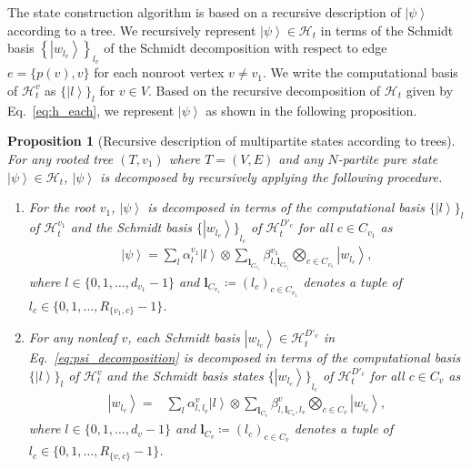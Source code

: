 \documentclass[preprintnumbers,aps,amsmath,amssymb,pra,twocolumn,showpacs,superscriptaddress,floatfix]{revtex4-1}
\def\Ket#1{\left|#1\right\rangle}
\theoremstyle{plain}
\newtheorem{proposition}[theorem]{Proposition}
\theoremstyle{definition}
\theoremstyle{remark}
\begin{document}
The state construction algorithm is based on a recursive description of $\Ket{\psi}$ according to a tree.  We recursively represent $\Ket{\psi} \in \mathcal{H}_t$ in terms of the Schmidt basis ${\left\{\Ket{w_{l_v}}\right\}}_{l_v}$ of the Schmidt decomposition with respect to edge $e=\{p(v),v\} $ for each nonroot vertex $v \neq v_1$.
We write the computational basis of $\mathcal{H}_t^v$ as ${\{\Ket{l}\}}_{l}$ for $v\in V$.  Based on the recursive decomposition of $\mathcal{H}_t$ given by Eq.~\eqref{eq:h_each}, we represent $\Ket{\psi}$ as shown in the following proposition.
\begin{proposition}[Recursive description of multipartite states according to trees]
\label{lem:decomposition_tree}
For any rooted tree $(T,v_1)$ where $T=(V, E)$ and any $N$-partite pure state $\Ket{\psi} \in \mathcal{H}_t$, $\Ket{\psi}$ is decomposed by recursively applying the following procedure.
\begin{enumerate}
  \item For the root $v_1$, $\Ket{\psi}$ is decomposed in terms of the computational basis ${\{ \Ket{l} \}}_l$ of $\mathcal{H}_t^{v_1}$ and the Schmidt basis ${\{ \Ket{w_{l_c}} \}}_{l_c}$ of $\mathcal{H}_t^{D'_c}$ for all $c \in C_{v_1}$ as
\begin{equation}
    \begin{split}
        \Ket{\psi} = \sum_{l} \alpha^{v_{1}}_l \Ket{l}  \otimes \sum_{{\boldsymbol{l}_{C_{v_1}}}} \beta_{l,\boldsymbol{l}_{C_{v_1}}}^{v_1}  \bigotimes_{c\in C_{v_1}}\Ket{w_{l_c}},
    \end{split}
    \label{eq:psi_decomposition}
\end{equation}
where $l \in \{ 0, 1, \ldots, d_{v_1}-1 \}$ and 
$\boldsymbol{l}_{C_{v_1}} \coloneqq {(l_c)}_{c\in C_{v_1}}$ denotes a tuple of $l_c \in \{ 0, 1, \ldots , R_{\{v_1, c \} }-1 \}$.


\item For any nonleaf $v$, each Schmidt basis $\Ket{w_{l_v}} \in \mathcal{H}_t^{D'_v}$ in Eq.~\eqref{eq:psi_decomposition} is decomposed in terms of the computational basis ${\{ \Ket{l} \}}_l$ of $\mathcal{H}_t^{v}$ and the Schmidt basis states ${\{ \Ket{w_{l_c}} \}}_{l_c}$ of $\mathcal{H}_t^{D'_c}$ for all $c \in C_{v}$ as
\begin{equation}
    \begin{split}
        \Ket{w_{l_v}} =& \sum_{l}\alpha^{v}_{l, l_v} \Ket{l}  \otimes 
        \sum_{\boldsymbol{l}_{C_v}}
        \beta_{l,\boldsymbol{l}_{C_v},l_v}^{v}  \bigotimes_{c\in C_v}\Ket{w_{l_c}},
    \end{split}
    \label{eq:w_decomposition}
\end{equation}
where $l \in \{ 0, 1, \ldots, d_{v}-1 \}$ and $\boldsymbol{l}_{C_{v}} \coloneqq {(l_c)}_{c\in C_{v}}$ denotes a tuple of $l_c \in \{ 0, 1, \ldots , R_{\{v, c \}}-1 \}$.
\end{enumerate}
\end{proposition}
\end{document}

